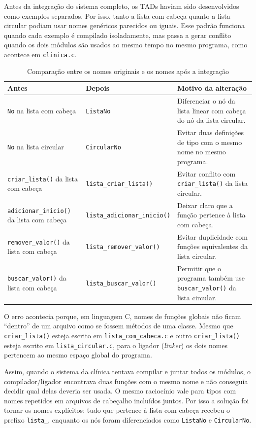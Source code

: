 \documentclass[11pt,a4paper]{article}
\begin{document}
Antes da integração do sistema completo, os TADs haviam sido desenvolvidos como exemplos separados. Por isso, tanto a lista com cabeça quanto a lista circular podiam usar nomes genéricos parecidos ou iguais. Esse padrão funciona quando cada exemplo é compilado isoladamente, mas passa a gerar conflito quando os dois módulos são usados ao mesmo tempo no mesmo programa, como acontece em \texttt{clinica.c}.

\begin{table}[h!]
\centering
\small
\renewcommand{\arraystretch}{1.25}
\begin{tabular}{@{}p{4.2cm}p{4.2cm}p{5.4cm}@{}}
\toprule
\textbf{Antes} & \textbf{Depois} & \textbf{Motivo da alteração} \\ \midrule
\texttt{No} na lista com cabeça & \texttt{ListaNo} & Diferenciar o nó da lista linear com cabeça do nó da lista circular. \\
\texttt{No} na lista circular & \texttt{CircularNo} & Evitar duas definições de tipo com o mesmo nome no mesmo programa. \\
\texttt{criar\_lista()} da lista com cabeça & \texttt{lista\_criar\_lista()} & Evitar conflito com \texttt{criar\_lista()} da lista circular. \\
\texttt{adicionar\_inicio()} da lista com cabeça & \texttt{lista\_adicionar\_inicio()} & Deixar claro que a função pertence à lista com cabeça. \\
\texttt{remover\_valor()} da lista com cabeça & \texttt{lista\_remover\_valor()} & Evitar duplicidade com funções equivalentes da lista circular. \\
\texttt{buscar\_valor()} da lista com cabeça & \texttt{lista\_buscar\_valor()} & Permitir que o programa também use \texttt{buscar\_valor()} da lista circular. \\
\bottomrule
\end{tabular}
\caption{Comparação entre os nomes originais e os nomes após a integração}
\end{table}

O erro acontecia porque, em linguagem C, nomes de funções globais não ficam ``dentro'' de um arquivo como se fossem métodos de uma classe. Mesmo que \texttt{criar\_lista()} esteja escrito em \texttt{lista\_com\_cabeca.c} e outro \texttt{criar\_lista()} esteja escrito em \texttt{lista\_circular.c}, para o ligador (\textit{linker}) os dois nomes pertencem ao mesmo espaço global do programa.

Assim, quando o sistema da clínica tentava compilar e juntar todos os módulos, o compilador/ligador encontrava duas funções com o mesmo nome e não conseguia decidir qual delas deveria ser usada. O mesmo raciocínio vale para tipos com nomes repetidos em arquivos de cabeçalho incluídos juntos. Por isso a solução foi tornar os nomes explícitos: tudo que pertence à lista com cabeça recebeu o prefixo \texttt{lista\_}, enquanto os nós foram diferenciados como \texttt{ListaNo} e \texttt{CircularNo}.
\end{document}
